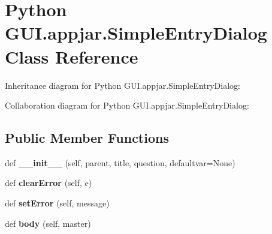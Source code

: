 \hypertarget{class_python_01_g_u_i_1_1appjar_1_1_simple_entry_dialog}{}\section{Python G\+U\+I.\+appjar.\+Simple\+Entry\+Dialog Class Reference}
\label{class_python_01_g_u_i_1_1appjar_1_1_simple_entry_dialog}


Inheritance diagram for Python G\+U\+I.\+appjar.\+Simple\+Entry\+Dialog\+:


Collaboration diagram for Python G\+U\+I.\+appjar.\+Simple\+Entry\+Dialog\+:
\subsection*{Public Member Functions}
\begin{DoxyCompactItemize}
\item 
\mbox{\label{class_python_01_g_u_i_1_1appjar_1_1_simple_entry_dialog_a04a4c764c9a6e16e5587defdb0780599}} 
def {\bfseries \+\_\+\+\_\+init\+\_\+\+\_\+} (self, parent, title, question, defaultvar=None)
\item 
\mbox{\label{class_python_01_g_u_i_1_1appjar_1_1_simple_entry_dialog_ab197f9b2f84fc6d8d0de337358744c8f}} 
def {\bfseries clear\+Error} (self, e)
\item 
\mbox{\label{class_python_01_g_u_i_1_1appjar_1_1_simple_entry_dialog_af6bfee57ad312185b036dc79ab511903}} 
def {\bfseries set\+Error} (self, message)
\item 
\mbox{\label{class_python_01_g_u_i_1_1appjar_1_1_simple_entry_dialog_ac55ac9b72bc422a0ff6646e201795ebd}} 
def {\bfseries body} (self, master)
\end{DoxyCompactItemize}
